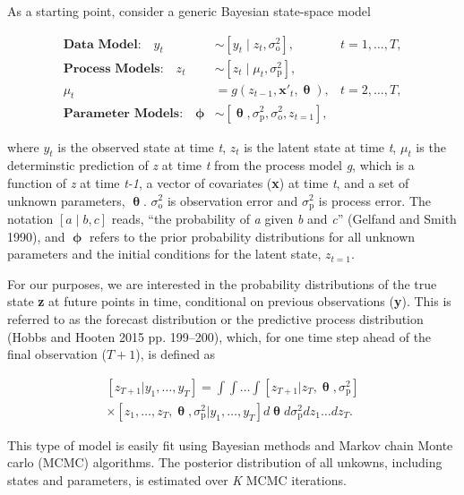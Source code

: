 \documentclass[12pt,]{article}
\begin{document}
As a starting point, consider a generic Bayesian state-space model

\begin{align}
\textbf{Data Model:} \quad y_t &\sim \left[y_t \;|\; z_t, \sigma^2_{\text{o}}\right], &t = 1,\dots,T, \\
\textbf{Process Models:} \quad z_t &\sim \left[z_t \;|\; \mu_t, \sigma^2_{\text{p}}\right],  \\
\mu_t &= g \left(z_{t-1},\textbf{x}'_t, \bm{\uptheta} \right), &t = 2,\dots,T, \\
\textbf{Parameter Models:} \quad \bm{\upphi} &\sim \left[\bm{\uptheta},\sigma^2_{\text{p}},\sigma^2_{\text{o}},z_{t=1} \right],
\end{align}

\noindent{}where \(y_t\) is the observed state at time \emph{t}, \(z_t\)
is the latent state at time \emph{t}, \(\mu_t\) is the determinstic
prediction of \emph{z} at time \emph{t} from the process model \emph{g},
which is a function of \emph{z} at time \emph{t-1}, a vector of
covariates (\textbf{x}) at time \emph{t}, and a set of unknown
parameters, \(\bm{\uptheta}\). \(\sigma^2_{\text{o}}\) is observation
error and \(\sigma^2_{\text{p}}\) is process error. The notation
\(\left[a \;|\; b, c\right]\) reads, ``the probability of \emph{a} given
\emph{b} and \emph{c}'' (Gelfand and Smith 1990), and \(\bm{\upphi}\)
refers to the prior probability distributions for all unknown parameters
and the initial conditions for the latent state, \(z_{t=1}\).

For our purposes, we are interested in the probability distributions of
the true state \textbf{z} at future points in time, conditional on
previous observations (\textbf{y}). This is referred to as the forecast
distribution or the predictive process distribution (Hobbs and Hooten
2015 pp. 199--200), which, for one time step ahead of the final
observation (\(T+1\)), is defined as

\begin{equation}
\begin{gathered}
\left[z_{T+1} | y_1,\dots,y_T \right] = \int \int \dots \int \left[z_{T+1} | z_T,\bm{\uptheta}, \sigma^2_{\text{p}} \right] \\ \times \left[z_1,\dots,z_T,\bm{\uptheta}, \sigma^2_{\text{p}} | y_1,\dots,y_T \right] d\bm{\uptheta} d\sigma^2_{\text{p}} dz_1 \dots dz_T.
\end{gathered}
\end{equation}

This type of model is easily fit using Bayesian methods and Markov chain
Monte carlo (MCMC) algorithms. The posterior distribution of all
unkowns, including states and parameters, is estimated over \emph{K}
MCMC iterations.
\end{document}
